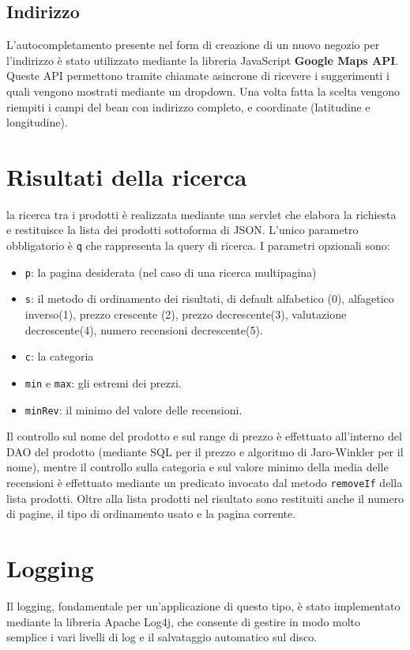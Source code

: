 \section{Indirizzo}
L'autocompletamento presente nel form di creazione di un nuovo negozio per l'indirizzo è stato utilizzato mediante la libreria JavaScript \textbf{Google Maps API}. Queste API permettono tramite chiamate asincrone di ricevere i suggerimenti i quali vengono mostrati mediante un dropdown. Una volta fatta la scelta vengono riempiti i campi del bean con indirizzo completo, e coordinate (latitudine e longitudine).

\chapter{Risultati della ricerca}
la ricerca tra i prodotti è realizzata mediante una servlet che elabora la richiesta e restituisce la lista dei prodotti sottoforma di JSON. L'unico parametro obbligatorio è \texttt{q} che rappresenta la query di ricerca.
I parametri opzionali sono:
\begin{itemize}
  \item \texttt{p}: la pagina desiderata (nel caso di  una ricerca multipagina)
  \item \texttt{s}: il metodo di ordinamento dei risultati, di default alfabetico (0), alfagetico inverso(1), prezzo crescente (2), prezzo decrescente(3), valutazione decrescente(4),  numero recensioni decrescente(5).
  \item \texttt{c}: la categoria
  \item \texttt{min} e \texttt{max}: gli estremi dei prezzi.
  \item \texttt{minRev}: il minimo del valore delle recensioni.
\end{itemize}
Il controllo sul nome del prodotto e sul range di prezzo è effettuato all'interno del DAO del prodotto (mediante SQL per il prezzo e algoritmo di Jaro-Winkler per il nome), mentre il controllo sulla categoria e sul valore minimo della media delle recensioni è effettuato mediante un predicato invocato dal metodo \texttt{removeIf} della lista prodotti.
Oltre alla lista prodotti nel risultato sono restituiti anche il numero di pagine, il tipo di ordinamento usato e la pagina corrente.


\chapter{Logging}
Il logging, fondamentale per un'applicazione di questo tipo, è stato implementato mediante la libreria Apache Log4j, che consente di gestire in modo molto semplice i vari livelli di log e il salvataggio automatico sul disco.

